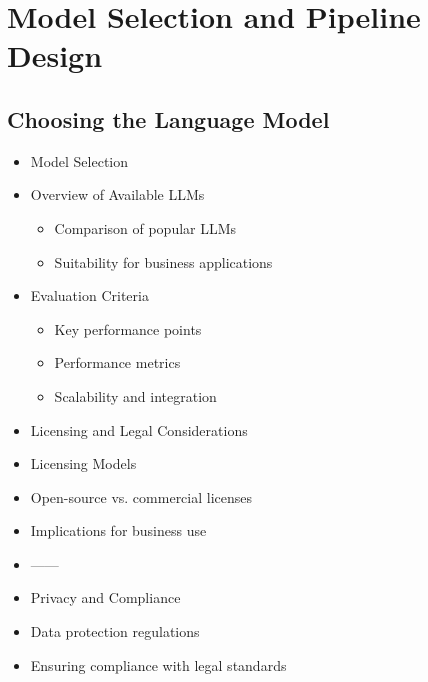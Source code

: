 \chapter{Model Selection and Pipeline Design}
\section{Choosing the Language Model}
\begin{itemize}
    \item Model Selection
    \item Overview of Available LLMs
    \begin{itemize}
        \item Comparison of popular LLMs
        \item Suitability for business applications
    \end{itemize}
    \item Evaluation Criteria
    \begin{itemize}
        \item Key performance points
        \item Performance metrics
        \item Scalability and integration
    \end{itemize}
\end{itemize}

\begin{itemize}
    \item Licensing and Legal Considerations
    \item Licensing Models
    \item Open-source vs. commercial licenses
    \item Implications for business use
    \item ------
    \item Privacy and Compliance
    \item Data protection regulations
    \item Ensuring compliance with legal standards
\end{itemize}

